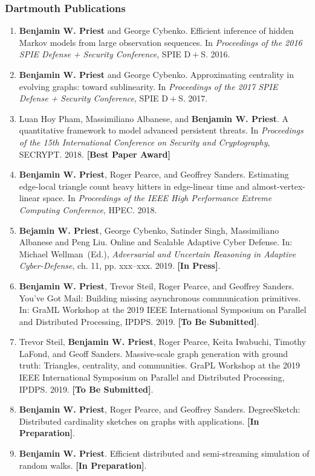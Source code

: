 \documentclass{beamer}
\begin{document}
\begin{frame}
\frametitle{Dartmouth Publications}

{\tiny
\begin{enumerate}
\item \textbf{Benjamin W. Priest} and George Cybenko.
	Efficient inference of hidden Markov models from large observation sequences.
	In \emph{Proceedings of the 2016 SPIE Defense + Security Conference}, 
	SPIE D$\! + \!$S.
	2016.

\item \textbf{Benjamin W. Priest} and George Cybenko.
	Approximating centrality in evolving graphs: toward sublinearity.
	In \emph{Proceedings of the 2017 SPIE Defense + Security Conference}, 
	SPIE D$\! + \!$S.
	2017.

\item Luan Hoy Pham, Massimiliano Albanese, and \textbf{Benjamin W. Priest}.
	A quantitative framework to model advanced persistent threats.
	In \emph{Proceedings of the 15th International Conference on Security and Cryptography}, 
	SECRYPT. 
	2018.
	\textbf{[Best Paper Award]}
	
\item \textbf{Benjamin W. Priest}, Roger Pearce, and Geoffrey Sanders.
	Estimating edge-local triangle count heavy hitters in edge-linear time and almost-vertex-linear space.
	In \emph{Proceedings of the IEEE High Performance Extreme Computing Conference}, 
	HPEC. 
	2018.
	
\item \textbf{Bejamin W. Priest}, George Cybenko, Satinder Singh, Massimiliano Albanese and Peng Liu.
	Online and Scalable Adaptive Cyber Defense. 
	In:
	Michael Wellman~(Ed.), \emph{Adversarial and Uncertain Reasoning in Adaptive Cyber-Defense}, ch.
	11, pp. xxx--xxx. 2019.
	\textbf{[In Press]}.

\item \textbf{Benjamin W. Priest}, Trevor Steil, Roger Pearce, and Geoffrey Sanders.
	You've {G}ot {M}ail: Building missing asynchronous communication primitives.
	In:
	GraML Workshop at the 2019 IEEE International Symposium on Parallel and Distributed Processing,
	IPDPS.
	2019.
	\textbf{[To Be Submitted]}.

\item Trevor Steil, \textbf{Benjamin W. Priest}, Roger Pearce, Keita Iwabuchi, Timothy LaFond, and Geoff Sanders. 
	Massive-scale graph generation with ground truth: Triangles, centrality, and communities.
	GraPL Workshop at the 2019 IEEE International Symposium on Parallel and Distributed Processing,
	IPDPS.
	2019.
	\textbf{[To Be Submitted]}.
	
\item \textbf{Benjamin W. Priest}, Roger Pearce, and Geoffrey Sanders.
	DegreeSketch: Distributed cardinality sketches on graphs with applications.
	\textbf{[In Preparation]}.

\item \textbf{Benjamin W. Priest}.
	Efficient distributed and semi-streaming simulation of random walks.
	\textbf{[In Preparation]}.
\end{enumerate}
}

\end{frame}
\end{document}
